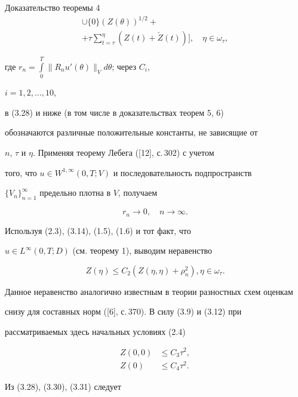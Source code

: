 \begin{pf*}{Доказательство теоремы 4}
\begin{multline}
{\cup\{0\}}(Z(\theta))^{1/2}+ \\


+\tau\sum_{t=\tau}^{\eta}


(Z(t)+\check Z(t))\bigg],\quad \eta\in\omega_{\tau},


\end{multline}


где $r_n=\int\limits_0^T\|R_nu'(\theta)\|_Vd\theta$; через $C_i$,


$i=1,2,\dotsc,10$,


в (3.28) и ниже (в том числе в доказательствах теорем 5, 6)


обозначаются различные положительные константы, не зависящие от


$n$, $\tau$ и $\eta$. Применяя теорему Лебега ([12], с.\,302) с учетом


того, что $u\in W^{1,\infty}(0,T;V)$ и последовательность подпространств


$\{V_n\}_{n=1}^{\infty}$ предельно плотна в $V$, получаем


\begin{equation}


r_n\to0,\quad n\to\infty.


\end{equation}





Используя (2.3), (3.14), (1.5), (1.6) и тот факт, что


$u\in L^{\infty}(0,T;D)$ (см. теорему 1), выводим неравенство


\begin{equation}


Z(\eta)\le C_2(Z(\eta,\eta)+\rho_n^2), \eta\in\omega_{\tau}.


\end{equation}


Данное неравенство аналогично известным в теории разностных схем оценкам


снизу для составных норм ([6], с.\,370). В силу (3.9) и (3.12) при


рассматриваемых здесь начальных условиях (2.4)


\begin{align}


Z(0,0)&\le C_3\tau^2,\\


Z(0)&\le C_4\tau^2.


\end{align}


Из (3.28), (3.30), (3.31) следует



\end{pf*}
